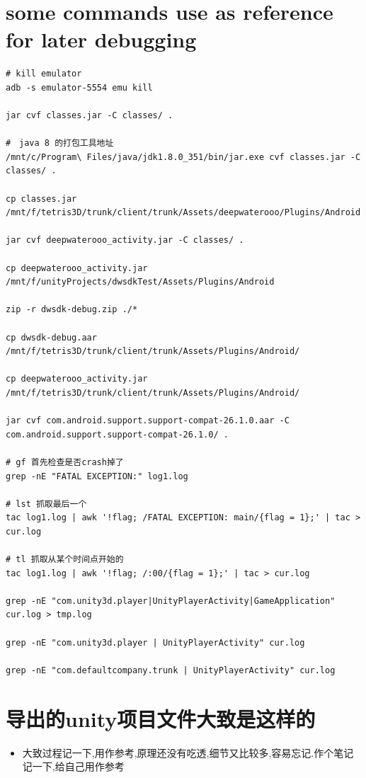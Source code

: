 \documentclass[9pt, b5paper]{article}
\begin{document}
\section{some commands use as reference for later debugging}
\label{sec-3}
\begin{verbatim}
# kill emulator
adb -s emulator-5554 emu kill   

jar cvf classes.jar -C classes/ .

#　java 8 的打包工具地址
/mnt/c/Program\ Files/java/jdk1.8.0_351/bin/jar.exe cvf classes.jar -C classes/ . 

cp classes.jar /mnt/f/tetris3D/trunk/client/trunk/Assets/deepwaterooo/Plugins/Android 

jar cvf deepwaterooo_activity.jar -C classes/ .       

cp deepwaterooo_activity.jar /mnt/f/unityProjects/dwsdkTest/Assets/Plugins/Android 

zip -r dwsdk-debug.zip ./*

cp dwsdk-debug.aar /mnt/f/tetris3D/trunk/client/trunk/Assets/Plugins/Android/

cp deepwaterooo_activity.jar /mnt/f/tetris3D/trunk/client/trunk/Assets/Plugins/Android/

jar cvf com.android.support.support-compat-26.1.0.aar -C com.android.support.support-compat-26.1.0/ .

# gf 首先检查是否crash掉了 
grep -nE "FATAL EXCEPTION:" log1.log

# lst 抓取最后一个
tac log1.log | awk '!flag; /FATAL EXCEPTION: main/{flag = 1};' | tac > cur.log

# tl 抓取从某个时间点开始的
tac log1.log | awk '!flag; /:00/{flag = 1};' | tac > cur.log

grep -nE "com.unity3d.player|UnityPlayerActivity|GameApplication" cur.log > tmp.log

grep -nE "com.unity3d.player | UnityPlayerActivity" cur.log

grep -nE "com.defaultcompany.trunk | UnityPlayerActivity" cur.log
\end{verbatim}

\section{导出的unity项目文件大致是这样的}
\label{sec-4}
\begin{itemize}
\item 大致过程记一下,用作参考,原理还没有吃透,细节又比较多,容易忘记.作个笔记记一下,给自己用作参考
\end{itemize}
\end{document}
